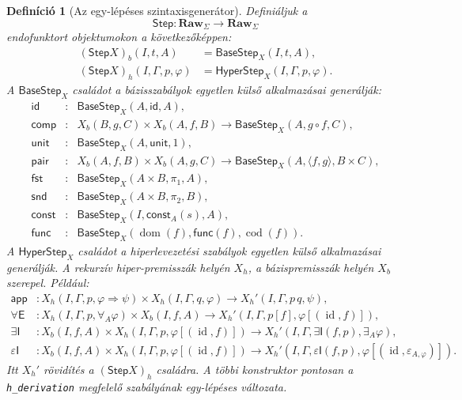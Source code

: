 \documentclass[11pt]{article}
\newtheorem{definition}{Definíció}
\newcommand{\Raw}{\mathbf{Raw}_{\Sigma}}
\newcommand{\Step}{\mathsf{Step}}
\newcommand{\id}{\operatorname{id}}
\newcommand{\eps}{\varepsilon}
\begin{document}
\begin{definition}[Az egy-lépéses szintaxisgenerátor]
Definiáljuk a
\[
  \Step:\Raw\longrightarrow\Raw
\]
endofunktort objektumokon a következőképpen:
\[
\begin{aligned}
  (\Step X)_b(I,t,A) &= \mathsf{BaseStep}_X(I,t,A),\\
  (\Step X)_h(I,\Gamma,p,\varphi) &= \mathsf{HyperStep}_X(I,\Gamma,p,\varphi).
\end{aligned}
\]
A $\mathsf{BaseStep}_X$ családot a bázisszabályok egyetlen külső
alkalmazásai generálják:
\[
\begin{array}{rcl}
\mathsf{id}      &:& \mathsf{BaseStep}_X(A,\mathsf{id},A),\\
\mathsf{comp}    &:& X_b(B,g,C)\times X_b(A,f,B)
                  \to \mathsf{BaseStep}_X(A,g\circ f,C),\\
\mathsf{unit}    &:& \mathsf{BaseStep}_X(A,\mathsf{unit},1),\\
\mathsf{pair}    &:& X_b(A,f,B)\times X_b(A,g,C)
                  \to \mathsf{BaseStep}_X(A,\langle f,g\rangle,B\times C),\\
\mathsf{fst}     &:& \mathsf{BaseStep}_X(A\times B,\pi_1,A),\\
\mathsf{snd}     &:& \mathsf{BaseStep}_X(A\times B,\pi_2,B),\\
\mathsf{const}   &:& \mathsf{BaseStep}_X(I,\mathsf{const}_A(s),A),\\
\mathsf{func}    &:& \mathsf{BaseStep}_X(\operatorname{dom}(f),
                         \mathsf{func}(f),\operatorname{cod}(f)).
\end{array}
\]
A $\mathsf{HyperStep}_X$ családot a hiperlevezetési szabályok egyetlen
külső alkalmazásai generálják. A rekurzív hiper-premisszák helyén $X_h$,
a bázispremisszák helyén $X_b$ szerepel. Például:
\[
\begin{aligned}
\mathsf{app} &: X_h(I,\Gamma,p,\varphi\Rightarrow\psi)
               \times X_h(I,\Gamma,q,\varphi)
               \to X_h'(I,\Gamma,p\,q,\psi),\\
\forall\mathsf{E} &: X_h(I,\Gamma,p,\forall_A\varphi)
               \times X_b(I,f,A)
               \to X_h'(I,\Gamma,p[f],\varphi[(\id,f)]),\\
\exists\mathsf{I} &: X_b(I,f,A)
               \times X_h(I,\Gamma,p,\varphi[(\id,f)])
               \to X_h'(I,\Gamma,\exists\mathsf{I}(f,p),\exists_A\varphi),\\
\eps\mathsf{I} &: X_b(I,f,A)
               \times X_h(I,\Gamma,p,\varphi[(\id,f)])
               \to
               X_h'(I,\Gamma,\eps\mathsf{I}(f,p),
                    \varphi[(\id,\eps_{A,\varphi})]).
\end{aligned}
\]
Itt $X_h'$ rövidítés a $(\Step X)_h$ családra. A többi konstruktor
pontosan a \texttt{h\_derivation} megfelelő szabályának egy-lépéses
változata.
\end{definition}
\end{document}
